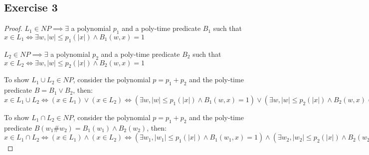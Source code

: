 \documentclass[12pt]{article}
\begin{document}
\subsection*{Exercise 3}
\begin{proof}
$L_1 \in NP \implies \exists$ a polynomial $p_1$ and a poly-time predicate $B_1$ such that $x \in L_1 \iff \exists w, |w| \leq p_1(|x|) \wedge B_1(w,x) = 1$

$L_2 \in NP \implies \exists$ a polynomial $p_2$ and a poly-time predicate $B_2$ such that $x \in L_2 \iff \exists w, |w| \leq p_2(|x|) \wedge B_2(w,x) = 1$
\newline

To show $L_1 \cup L_2 \in NP$, consider the polynomial $p = p_1 + p_2$ and the poly-time predicate $B = B_1 \vee B_2$, then: $x \in L_1 \cup L_2 \iff (x \in L_1) \vee (x \in L_2) \iff (\exists w, |w| \leq p_1(|x|) \wedge B_1(w,x) = 1) \vee (\exists w, |w| \leq p_2(|x|) \wedge B_2(w,x) = 1) \iff \exists w, |w| \leq p(|x|) \wedge B(w,x) = 1$
\newline

To show $L_1 \cap L_2 \in NP$, consider the polynomial $p = p_1 + p_2$ and the poly-time predicate $B(w_1 \# w_2) = B_1(w_1) \wedge B_2(w_2)$, then: $x \in L_1 \cap L_2 \iff (x \in L_1) \wedge (x \in L_2) \iff (\exists w_1, |w_1| \leq p_1(|x|) \wedge B_1(w_1,x) = 1) \wedge (\exists w_2, |w_2| \leq p_2(|x|) \wedge B_2(w_2,x) = 1) \iff \exists w, w = w_1 \# w_2, |w| \leq p(|x|) \wedge B(w,x) = 1$
\end{proof}
\end{document}
